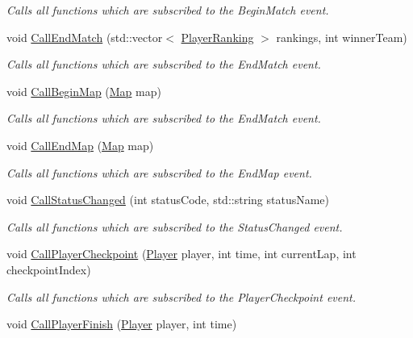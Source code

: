 \begin{DoxyCompactItemize}
\begin{DoxyCompactList}\small\item\em Calls all functions which are subscribed to the Begin\-Match event. \end{DoxyCompactList}\item 
void \hyperlink{classEventManager_adc21931d4388f9b78c3dbd382acfabc9}{Call\-End\-Match} (std\-::vector$<$ \hyperlink{structPlayerRanking}{Player\-Ranking} $>$ rankings, int winner\-Team)
\begin{DoxyCompactList}\small\item\em Calls all functions which are subscribed to the End\-Match event. \end{DoxyCompactList}\item 
void \hyperlink{classEventManager_a1bd59c3d511d37863b81d18bd09a7b5a}{Call\-Begin\-Map} (\hyperlink{structMap}{Map} map)
\begin{DoxyCompactList}\small\item\em Calls all functions which are subscribed to the End\-Match event. \end{DoxyCompactList}\item 
void \hyperlink{classEventManager_a9f28bea93fdee6cfc07e8a56a81cc62f}{Call\-End\-Map} (\hyperlink{structMap}{Map} map)
\begin{DoxyCompactList}\small\item\em Calls all functions which are subscribed to the End\-Map event. \end{DoxyCompactList}\item 
void \hyperlink{classEventManager_aaf340ac134fc52a9b2c87f7db42476b5}{Call\-Status\-Changed} (int status\-Code, std\-::string status\-Name)
\begin{DoxyCompactList}\small\item\em Calls all functions which are subscribed to the Status\-Changed event. \end{DoxyCompactList}\item 
void \hyperlink{classEventManager_a8a3c5f621c44b15c560110ab2b25a51f}{Call\-Player\-Checkpoint} (\hyperlink{structPlayer}{Player} player, int time, int current\-Lap, int checkpoint\-Index)
\begin{DoxyCompactList}\small\item\em Calls all functions which are subscribed to the Player\-Checkpoint event. \end{DoxyCompactList}\item 
void \hyperlink{classEventManager_afb2a6208c30bc3c1b4a85e39a8f9a9f4}{Call\-Player\-Finish} (\hyperlink{structPlayer}{Player} player, int time)

\end{DoxyCompactItemize}
